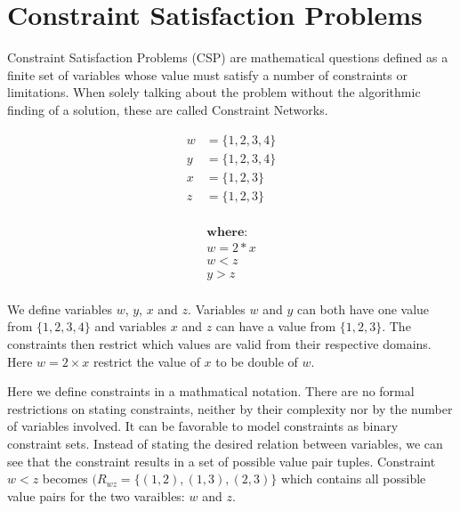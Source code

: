 
\chapter{Constraint Satisfaction Problems}

Constraint Satisfaction Problems (CSP) are mathematical questions defined as a finite set of variables whose value must satisfy a number of constraints or limitations. When solely talking about the problem without the algorithmic finding of a solution, these are called Constraint Networks.

\begin{tcolorbox}[title=Example:]
	\begin{multicols}{2}
		\begin{equation*}
			\begin{aligned}
				w & = \{1, 2, 3, 4\} \\
				y & = \{1, 2, 3, 4\} \\
				x & = \{1, 2, 3\}    \\
				z & = \{1, 2, 3\}    \\
			\end{aligned}
		\end{equation*}

		\columnbreak

		\noindent
		\begin{equation*}
			\begin{aligned}
				\textbf{where:} \\
				w = 2*x         \\
				w < z           \\
				y > z           \\
			\end{aligned}
		\end{equation*}
	\end{multicols}
\end{tcolorbox}

We define variables $w$, $y$, $x$ and $z$. Variables $w$ and $y$ can both have one value from $\{1, 2, 3, 4\}$ and variables $x$ and $z$ can have a value from $\{1, 2, 3\}$. The constraints then restrict which values are valid from their respective domains. Here $w = 2 \times x$ restrict the value of $x$ to be double of $w$.

Here we define constraints in a mathmatical notation. There are no formal restrictions on stating constraints, neither by their complexity nor by the number of variables involved. It can be favorable to model constraints as binary constraint sets. Instead of stating the desired relation between variables, we can see that the constraint results in a set of possible value pair tuples. Constraint $w < z$ becomes $(R_{wz} = \{(1, 2), (1, 3), (2, 3)\}$ which contains all possible value pairs for the two varaibles: $w$ and $z$.

